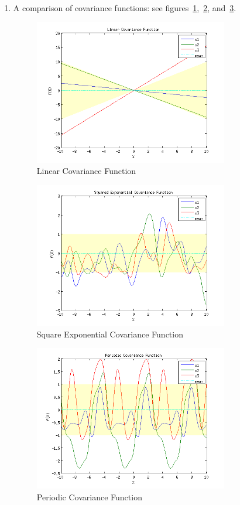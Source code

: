 \documentclass{article}
\begin{document}
\begin{enumerate}[label=(\alph*)]
\item A comparison of covariance functions: see figures~\ref{fig:1a1},~\ref{fig:1a2}, and~\ref{fig:1a3}.
\begin{figure}[H]
\centering
\includegraphics[width=0.8\textwidth]{1_a_1.png}
\caption{Linear Covariance Function}
\label{fig:1a1}
\end{figure}
\begin{figure}[H]
\centering
\includegraphics[width=0.8\textwidth]{1_a_2.png}
\caption{Square Exponential Covariance Function}
\label{fig:1a2}
\end{figure}
\begin{figure}[H]
\centering
\includegraphics[width=0.8\textwidth]{1_a_3.png}
\caption{Periodic Covariance Function}
\label{fig:1a3}
\end{figure}


\end{enumerate}
\end{document}
